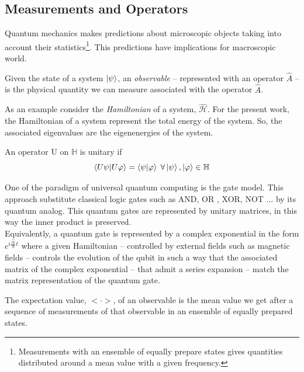 \subsection{Measurements and Operators}
Quantum mechanics makes predictions about microscopic objects taking into account their statistics\footnote{Measurements with an ensemble of equally prepare states gives quantities distributed around a mean value with a given frequency.}. This predictions have implications for macroscopic world.
\begin{definition}[Operator]
    
\end{definition}
\begin{definition}[Observable]
    Given the state of a system $\ket{\psi}$, an \textit{observable} -- represented with an operator $\hat{A}$ -- is the physical quantity we can measure associated with the operator $\hat{A}$. 
\end{definition}
\begin{flushleft}
   As an example consider the \textit{Hamiltonian} of a system, $\hat{\mathcal{H}}$. For the present work, the Hamiltonian of a system represent the total energy of the system. So, the associated eigenvalues are the eigenenergies of the system.  
\end{flushleft}
\begin{definition}
    An operator U on $\mathbb{H}$ is unitary if
    \begin{equation}
        \braket{U\psi|U\varphi} = \braket{\psi|\varphi} \; \forall \ket{\psi},\ket{\varphi} \in \mathbb{H}
    \end{equation}
\end{definition}
\begin{flushleft}
   One of the paradigm of universal quantum computing is the gate model. This approach substitute classical logic gates such as AND, OR , XOR, NOT ... by its quantum analog. This quantum gates are represented by unitary matrices, in this way the inner product is preserved.\\
Equivalently, a quantum gate is represented by a complex exponential in the form $e^{i\frac{\hat{\mathcal{H}}}{\hbar}t}$ where a given Hamiltonian -- controlled by external fields such as magnetic fields -- controls the evolution of the qubit in such a way that the associated matrix of the complex exponential -- that admit a series expansion -- match the matrix representation of the quantum gate.
\end{flushleft}
\begin{definition}
    The expectation value, $<\cdot>$, of an observable is the mean value we get after a sequence of measurements of that observable in an ensemble of equally prepared states.
\end{definition}
